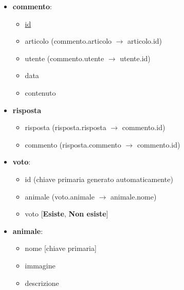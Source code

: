\begin{itemize}
        \item \textbf{commento}:
        \begin{itemize}
            \item \underline{id}
            \item articolo (commento.articolo $\rightarrow$ articolo.id)
            \item utente (commento.utente $\rightarrow$ utente.id)
            \item data
            \item contenuto
        \end{itemize}

        \item \textbf{risposta}
        \begin{itemize}
            \item risposta (risposta.risposta $\rightarrow$ commento.id)
            \item commento (risposta.commento $\rightarrow$ commento.id)
        \end{itemize}

        \item \textbf{voto}:
        \begin{itemize}
            \item id (chiave primaria generato automaticamente)
            \item animale (voto.animale $\rightarrow$ animale.nome)
            \item voto [\textbf{Esiste}, \textbf{Non esiste}]
        \end{itemize}

        \item \textbf{animale}:
        \begin{itemize}
            \item nome [chiave primaria]
            \item immagine
            \item descrizione
        \end{itemize}
    \end{itemize}